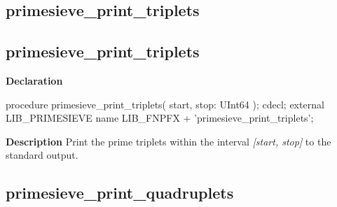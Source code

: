 \documentclass{report}
\newif\ifpdf
\begin{document}
\subsection*{\large{\textbf{primesieve{\_}print{\_}triplets}}\normalsize\hspace{1ex}\hrulefill}
\else
\subsection*{primesieve{\_}print{\_}triplets}
\fi
\label{primesieve-primesieve_print_triplets}
\begin{list}{}{
\setlength{\itemindent}{0cm}
\setlength{\listparindent}{0cm}
\setlength{\leftmargin}{\evensidemargin}
\addtolength{\leftmargin}{\tmplength}
\settowidth{\labelsep}{X}
\addtolength{\leftmargin}{\labelsep}
\setlength{\labelwidth}{\tmplength}
}
\item[\textbf{Declaration}\hfill]
\ifpdf
\begin{flushleft}
\fi
\begin{ttfamily}
procedure primesieve{\_}print{\_}triplets( start, stop: UInt64 ); cdecl; external LIB{\_}PRIMESIEVE name LIB{\_}FNPFX + 'primesieve{\_}print{\_}triplets';\end{ttfamily}

\ifpdf
\end{flushleft}
\fi

\par
\item[\textbf{Description}]
Print the prime triplets within the interval \textit{[start, stop]} to the standard output.

\end{list}
\ifpdf
\subsection*{\large{\textbf{primesieve{\_}print{\_}quadruplets}}\normalsize\hspace{1ex}\hrulefill}
\else
\end{document}
